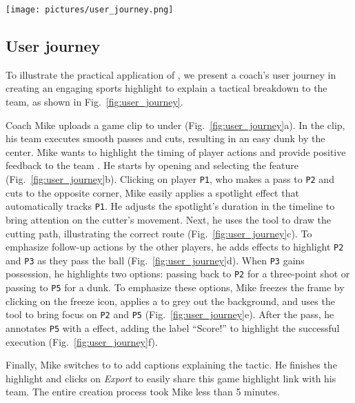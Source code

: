\begin{figure*}[ht!]
    \centering
    \texttt{[image: pictures/user\_journey.png]}
    \vspace{-6mm}
    \caption{A demonstration of a coach adding insights with visualization features on \SB{}: starting with uploading a clip (a), highlighting player movements and tactics (b-d), and annotating insights with a video freeze frame, background filter, and text labels (e-f).
    } 
    \label{fig:user_journey}
    \vspace{-3mm}
\end{figure*}


\subsection{User journey}
To illustrate the practical application of \SB{}, we present a coach's user journey in creating an engaging sports highlight to explain a tactical breakdown to the team, as shown in Fig.~\ref{fig:user_journey}.

Coach Mike uploads a game clip to \SB{} under \Media{} (Fig.~\ref{fig:user_journey}a). In the clip, his team executes smooth passes and cuts, resulting in an easy dunk by the center. Mike wants to highlight the timing of player actions and provide positive feedback to the team .
He starts by opening \Highlight{} and selecting the \Spotlight{} feature (Fig.~\ref{fig:user_journey}b). Clicking on player \texttt{P1}, who makes a pass to \texttt{P2} and cuts to the opposite corner, Mike easily applies a spotlight effect that automatically tracks \texttt{P1}. He adjusts the spotlight's duration in the timeline to bring attention on the cutter's movement. 
Next, he uses the \Path{} tool to draw the cutting path, illustrating the correct route (Fig.~\ref{fig:user_journey}c).
To emphasize follow-up actions by the other players, he adds \Circle{} effects to highlight \texttt{P2} and \texttt{P3} as they pass the ball (Fig.~\ref{fig:user_journey}d). 
When \texttt{P3} gains possession, he highlights two options: passing back to \texttt{P2} for a three-point shot or passing to \texttt{P5} for a dunk. To emphasize these options, Mike freezes the frame by clicking on the freeze icon, applies a \BGFilter{} to grey out the background, and uses the \Spotlight{} tool to bring focus on \texttt{P2} and \texttt{P5} (Fig.~\ref{fig:user_journey}e). After the pass, he annotates \texttt{P5} with a \Text{} effect, adding the label ``Score!'' to highlight the successful execution (Fig.~\ref{fig:user_journey}f).

Finally, Mike switches to \Narrative{} to add captions explaining the tactic. He finishes the highlight and clicks on \textit{Export} to easily share this game highlight link with his team. 
The entire creation process took Mike less than 5 minutes.
